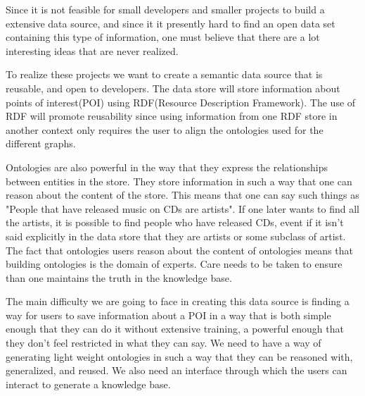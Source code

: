 Since it is not feasible for small developers and smaller projects to build a extensive data source, and since it it presently hard to find an open data set containing this type of information,  one must believe that there are a lot interesting ideas that are never realized.

To realize these projects we want to create a semantic data source that is reusable, and open to developers.
The data store will store information about points of interest(POI) using RDF(Resource Description Framework). 
The use of RDF will promote reusability since using information from one RDF store in another context only requires the user to align the ontologies used for the different graphs. 

Ontologies are also powerful in the way that they express the relationships between entities in the store. 
They store information in such a way that one can reason about the content of the store. 
This means that one can say such things as "People that have released music on CDs are artists". 
If one later wants to find all the artists, it is possible to find people who have released CDs, event if it isn't said explicitly in the data store that they are artists or some subclass of artist.
The fact that ontologies users reason about the content of ontologies means that building ontologies is the domain of experts. 
Care needs to be taken to ensure than one maintains the truth in the knowledge base.

The main difficulty we are going to face in creating this data source is finding a way for users to save information about a POI in a way that is both simple enough that they can do it without extensive training, a powerful enough that they don't feel restricted in what they can say.
We need to have a way of generating light weight ontologies in such a way that they can be reasoned with, generalized, and reused. We also need an interface through which the users can interact to generate a knowledge base.
